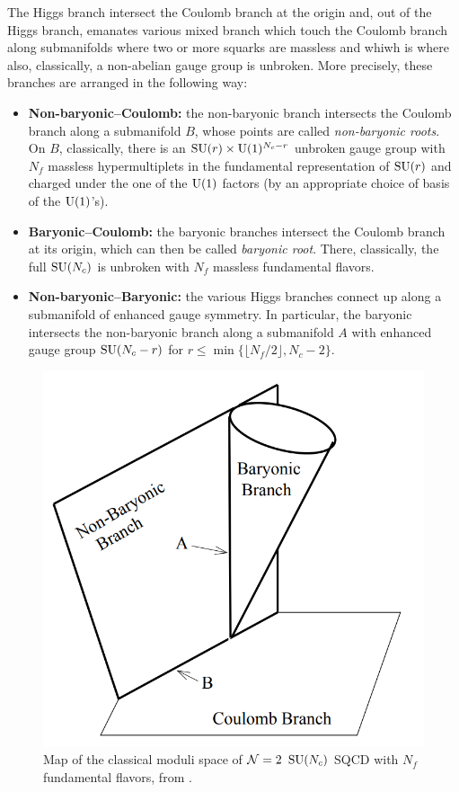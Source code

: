         The Higgs branch intersect the Coulomb branch at the origin and, out of the Higgs branch, emanates various mixed branch which touch the Coulomb branch along submanifolds where two or more squarks are massless and whiwh is where also, classically, a non-abelian gauge group is unbroken. More precisely, these branches are arranged in the following way:
        \begin{itemize}
            \item \textbf{Non-baryonic--Coulomb:} the non-baryonic branch intersects the Coulomb branch along a submanifold $B$, whose points are called \emph{non-baryonic roots}. On $B$, classically, there is an $\text{SU}(r)\times\text{U}(1)^{N_c-r}$ unbroken gauge group with $N_f$ massless hypermultiplets in the fundamental representation of $\text{SU}(r)$ and charged under the one of the $\text{U}(1)$ factors (by an appropriate choice of basis of the $\text{U}(1)$'s). 
            \item \textbf{Baryonic--Coulomb:} the baryonic branches intersect the Coulomb branch at its origin, which can then be called \emph{baryonic root}. There, classically, the full $\text{SU}(N_c)$ is unbroken with $N_f$ massless fundamental flavors.
            \item \textbf{Non-baryonic--Baryonic:} the various Higgs branches connect up along a submanifold of enhanced gauge symmetry. In particular, the baryonic intersects the non-baryonic branch along a submanifold $A$ with enhanced gauge group $\text{SU}(N_c-r)$ for $r\leq \min\{\lfloor N_f/2\rfloor,N_c-2\}$.
        \end{itemize}
        
        \begin{figure}[H]
            \centering
            \includegraphics[scale=0.3]{Pictures/classicalmodulispace.png}
            \caption{Map of the classical moduli space of $\mathcal{N}=2$ $\text{SU}(N_c)$ SQCD with $N_f$ fundamental flavors, from \cite{Argyres_1996}.}
        \end{figure}

